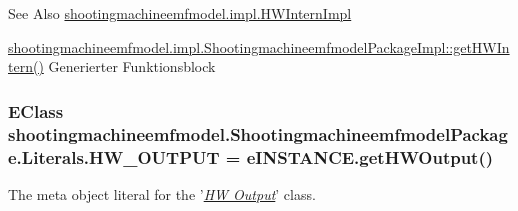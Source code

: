 \begin{DoxySeeAlso}{See Also}
\hyperlink{classshootingmachineemfmodel_1_1impl_1_1_h_w_intern_impl}{shootingmachineemfmodel.\-impl.\-H\-W\-Intern\-Impl} 

\hyperlink{classshootingmachineemfmodel_1_1impl_1_1_shootingmachineemfmodel_package_impl_a4d79c0f3a00def45b86046e8908636e7}{shootingmachineemfmodel.\-impl.\-Shootingmachineemfmodel\-Package\-Impl\-::get\-H\-W\-Intern()} Generierter Funktionsblock 
\end{DoxySeeAlso}
\hypertarget{interfaceshootingmachineemfmodel_1_1_shootingmachineemfmodel_package_1_1_literals_ae96d4be80e17f106f86c757095eb815a}{
\subsubsection[{H\-W\-\_\-\-O\-U\-T\-P\-U\-T}]{\setlength{\rightskip}{0pt plus 5cm}E\-Class shootingmachineemfmodel.\-Shootingmachineemfmodel\-Package.\-Literals.\-H\-W\-\_\-\-O\-U\-T\-P\-U\-T = e\-I\-N\-S\-T\-A\-N\-C\-E.\-get\-H\-W\-Output()}}\label{interfaceshootingmachineemfmodel_1_1_shootingmachineemfmodel_package_1_1_literals_ae96d4be80e17f106f86c757095eb815a}
The meta object literal for the '\hyperlink{classshootingmachineemfmodel_1_1impl_1_1_h_w_output_impl}{{\itshape H\-W Output}}' class.

